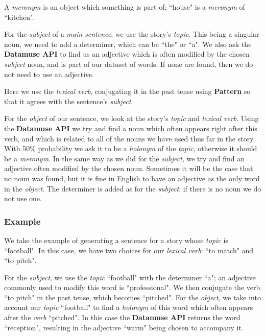 \begin{definition}[Meronym]
A \textit{meronym} is an object which something is part of; ``house" is a \textit{meronym} of ``kitchen".
\end{definition}

\noindent
For the \textit{subject} of a \textit{main sentence}, we use the story's \textit{topic}. This being a singular noun, we need to add a determiner, which can be ``the" or ``a". We also ask the \textbf{Datamuse API} to find us an adjective which is often modified by the chosen \textit{subject} noun, and is part of our dataset of words. If none are found, then we do not need to use an adjective.

Here we use the \textit{lexical verb}, conjugating it in the past tense using \textbf{Pattern} so that it agrees with the sentence's \textit{subject}.

For the \textit{object} of our sentence, we look at the story's \textit{topic} and \textit{lexical verb}. Using the \textbf{Datamuse API} we try and find a noun which often appears right after this verb, and which is related to all of the nouns we have used thus far in the story. With 50\% probability we ask it to be a \textit{holonym} of the \textit{topic}, otherwise it should be a \textit{meronym}. In the same way as we did for the \textit{subject}, we try and find an adjective often modified by the chosen noun. Sometimes it will be the case that no noun was found, but it is fine in English to have an adjective as the only word in the \textit{object}. The determiner is added as for the \textit{subject}; if there is no noun we do not use one.

\subsubsection*{Example}

We take the example of generating a sentence for a story whose \textit{topic} is ``football". In this case, we have two choices for our \textit{lexical verb}: ``to match" and ``to pitch".

For the \textit{subject}, we use the \textit{topic} ``football" with the determiner ``a"; an adjective commonly used to modify this word is ``professional". We then conjugate the verb ``to pitch" in the past tense, which becomes ``pitched". For the \textit{object}, we take into account our \textit{topic} ``football" to find a \textit{holonym} of this word which often appears after the \textit{verb} ``pitched". In this case the \textbf{Datamuse API} returns the word ``reception", resulting in the adjective ``warm" being chosen to accompany it.

